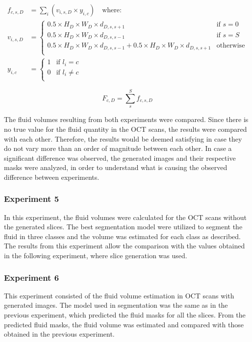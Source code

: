 \begin{equation}
	\begin{aligned}
		f_{c,s,D} &= \sum_{i} \left( v_{i,s,D} \times y_{i,c} \right) \quad \text{where: }\\
		v_{i,s,D} &=
		\begin{cases}
			0.5 \times H_{D} \times W_{D} \times d_{D,s,s+1} & \text{if $s=0$}\\
			0.5 \times H_{D} \times W_{D} \times d_{D,s,s-1} & \text{if $s=S$}\\
			0.5 \times H_{D} \times W_{D} \times d_{D,s,s-1} + 0.5 \times H_{D} \times W_{D} \times d_{D,s,s+1} & 
			\text{otherwise}\\
		\end{cases}\\
		y_{i,c} &=
		\begin{cases}
			1 &\text{if } l_{i} = c\\
			0 &\text{if } l_{i} \neq c\\
		\end{cases} 
		\label{eq:FluidEstimationSlice}
	\end{aligned}
\end{equation}

\begin{equation}
	F_{c,D} = \sum_{s}^{S} f_{c,s,D}
	\label{eq:FluidEstimationVolume}
\end{equation}

The fluid volumes resulting from both experiments were compared. Since there is no true value for the fluid quantity in the OCT scans, the results were compared with each other. Therefore, the results would be deemed satisfying in case they do not vary more than an order of magnitude between each other. In case a significant difference was observed, the generated images and their respective masks were analyzed, in order to understand what is causing the observed difference between experiments.

\subsubsection{Experiment 5}
In this experiment, the fluid volumes were calculated for the OCT scans without the generated slices. The best segmentation model were utilized to segment the fluid in three classes and the volume was estimated for each class as described. The results from this experiment allow the comparison with the values obtained in the following experiment, where slice generation was used.

\subsubsection{Experiment 6}
This experiment consisted of the fluid volume estimation in OCT scans with generated images. The model used in segmentation was the same as in the previous experiment, which predicted the fluid masks for all the slices. From the predicted fluid masks, the fluid volume was estimated and compared with those obtained in the previous experiment. 